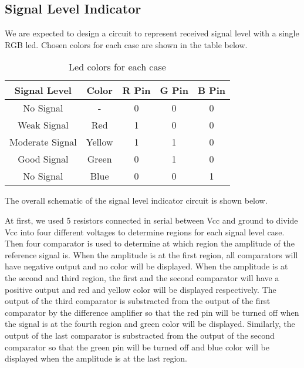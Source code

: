 \documentclass[conference]{IEEEtran}
\begin{document}
\subsection{Signal Level Indicator}
We are expected to design a circuit to represent received signal level with a single RGB led. Chosen colors for 
each case are shown in the table below.
\begin{table}[htbp]
    \caption{Led colors for each case}
    \begin{center}
    \begin{tabular}{|c|c|c|c|c|}
    \hline
    \textbf{Signal Level} & \textbf{Color}& \textbf{R Pin}& \textbf{G Pin}& \textbf{B Pin} \\
    \hline
    No Signal & - & 0 & 0 & 0\\
    \hline
    Weak Signal & Red & 1 & 0 & 0\\
    \hline
    Moderate Signal & Yellow & 1 & 1 & 0\\
    \hline
    Good Signal & Green & 0 & 1 & 0\\
    \hline
    No Signal & Blue & 0 & 0 & 1\\
    \hline
    \end{tabular}
    \label{tab1}
    \end{center}
\end{table}
The overall schematic of the signal level indicator circuit is shown below. \\
\par At first, we used 5 resistors connected in serial between Vcc and ground to divide Vcc into four different voltages 
to determine regions for each signal level case. 
Then four comparator is used to determine at which region the amplitude of the reference signal is. When the amplitude 
is at the first region, all comparators will have negative output and no color will be displayed. When the amplitude 
is at the second and third region, the first and the second comparator will have a positive output and red and yellow 
color will be displayed respectively. The output of the third comparator is substracted from the output of the first 
comparator by the difference amplifier so that the red pin will be turned off when the signal is at the fourth region 
and green color will be displayed. Similarly, the output of the last comparator is substracted from the output of the 
second comparator so that the green pin will be turned off and blue color will be displayed when the amplitude is at the 
last region. \\
\end{document}
